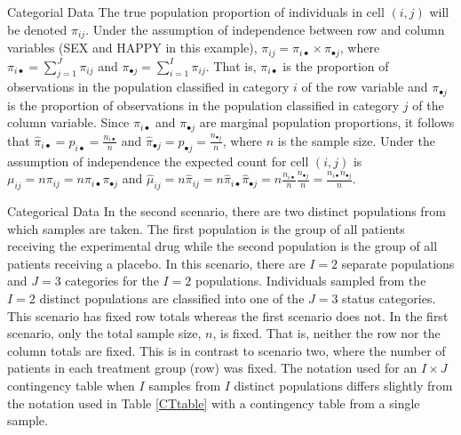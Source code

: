 \documentclass[
  ignorenonframetext,
]{beamer}
\begin{document}
\begin{frame}{Categorial Data}
\protect\hypertarget{categorial-data}{}
The true population proportion of individuals in cell \((i, j)\) will be
denoted \(\pi_{ij}\). Under the assumption of independence between row
and column variables (SEX and HAPPY in this example),
\(\pi_{ij}=\pi_{i\bullet} \times \pi_{\bullet j}\), where
\(\pi_{i\bullet}=\sum_{j=1}^{J} \pi_{ij}\) and
\(\pi_{\bullet j}=\sum_{i=1}^{I} \pi_{ij}\). That is, \(\pi_{i\bullet}\)
is the proportion of observations in the population classified in
category \(i\) of the row variable and \(\pi_{\bullet j}\) is the
proportion of observations in the population classified in category
\(j\) of the column variable. Since \(\pi_{i\bullet}\) and
\(\pi_{\bullet j}\) are marginal population proportions, it follows that
\(\hat\pi_{i\bullet}=p_{i\bullet}=\frac{n_{i\bullet}}{n}\) and
\(\hat\pi_{\bullet j}=p_{\bullet j}=\frac{n_{\bullet j}}{n}\), where
\(n\) is the sample size. Under the assumption of independence the
expected count for cell \((i, j)\) is
\(\mu_{ij}= n \pi_{ij}=n \pi_{i\bullet}\pi_{\bullet j}\) and
\(\hat\mu_{ij}=n\hat\pi_{ij} = n\hat\pi_{i\bullet} \hat\pi_{\bullet j} = n \frac{n_{i\bullet}}{n}\frac{n_{\bullet j}}{n} = \frac{n_{i\bullet}n_{\bullet j}}{n}.\)
\end{frame}

\begin{frame}{Categorical Data}
\protect\hypertarget{categorical-data-3}{}
In the second scenario, there are two distinct populations from which
samples are taken. The first population is the group of all patients
receiving the experimental drug while the second population is the group
of all patients receiving a placebo. In this scenario, there are \(I=2\)
separate populations and \(J=3\) categories for the \(I=2\) populations.
Individuals sampled from the \(I=2\) distinct populations are classified
into one of the \(J=3\) status categories. This scenario has fixed row
totals whereas the first scenario does not. In the first scenario, only
the total sample size, \(n\), is fixed. That is, neither the row nor the
column totals are fixed. This is in contrast to scenario two, where the
number of patients in each treatment group (row) was fixed. The notation
used for an \(I \times J\) contingency table when \(I\) samples from
\(I\) distinct populations differs slightly from the notation used in
Table \ref{CTtable} with a contingency table from a single sample.
\end{frame}
\end{document}

